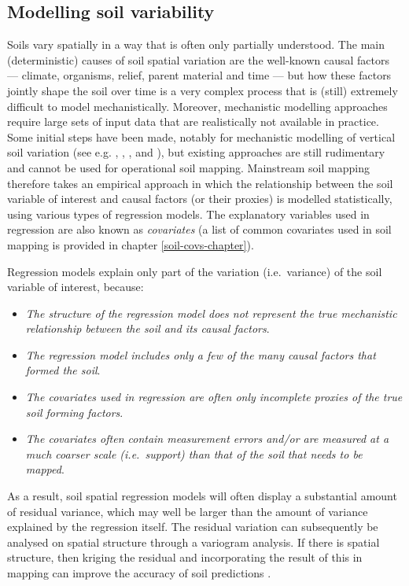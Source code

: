 \documentclass[11pt]{krantz}
\theoremstyle{definition}
\theoremstyle{definition}
\theoremstyle{definition}
\theoremstyle{remark}
\begin{document}
\hypertarget{modelling-soil-variability}{%
\subsection{Modelling soil
variability}\label{modelling-soil-variability}}

Soils vary spatially in a way that is often only partially understood.
The main (deterministic) causes of soil spatial variation are the
well-known causal factors --- climate, organisms, relief, parent
material and time --- but how these factors jointly shape the soil over
time is a very complex process that is (still) extremely difficult to
model mechanistically. Moreover, mechanistic modelling approaches
require large sets of input data that are realistically not available in
practice. Some initial steps have been made, notably for mechanistic
modelling of vertical soil variation (see e.g. \citet{Finke2008462},
\citet{Sommer2008480}, \citet{Minasny2008140}, and
\citet{vanwalleghem2010spatial}), but existing approaches are still
rudimentary and cannot be used for operational soil mapping. Mainstream
soil mapping therefore takes an empirical approach in which the
relationship between the soil variable of interest and causal factors
(or their proxies) is modelled statistically, using various types of
regression models. The explanatory variables used in regression are also
known as \emph{covariates} (a list of common covariates used in soil
mapping is provided in chapter \ref{soil-covs-chapter}).

Regression models explain only part of the variation (i.e.~variance) of
the soil variable of interest, because:

\begin{itemize}
\item
  \emph{The structure of the regression model does not represent the
  true mechanistic relationship between the soil and its causal
  factors}.
\item
  \emph{The regression model includes only a few of the many causal
  factors that formed the soil}.
\item
  \emph{The covariates used in regression are often only incomplete
  proxies of the true soil forming factors}.
\item
  \emph{The covariates often contain measurement errors and/or are
  measured at a much coarser scale (i.e.~support) than that of the soil
  that needs to be mapped}.
\end{itemize}

As a result, soil spatial regression models will often display a
substantial amount of residual variance, which may well be larger than
the amount of variance explained by the regression itself. The residual
variation can subsequently be analysed on spatial structure through a
variogram analysis. If there is spatial structure, then kriging the
residual and incorporating the result of this in mapping can improve the
accuracy of soil predictions \citep{hengl2007regression}.
\end{document}
